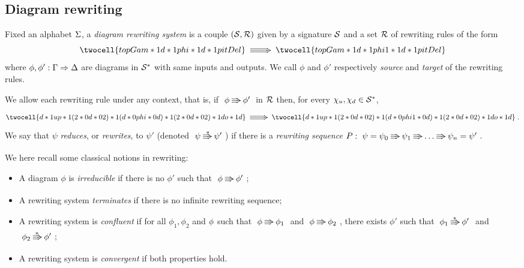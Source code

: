 \documentclass[a4paper]{article}
\begin{document}
\subsection{Diagram rewriting}
\begin{definition}
Fixed an alphabet $\Sigma$, a \emph{diagram rewriting system} is  a couple $(\mathcal S, \mathcal R)$ given by a signature $\mathcal S$ and a set $\mathcal R$ of rewriting rules of the form
$$
\twocell{topGam *1 d *1 phi *1 d *1 pitDel}
\xymatrix{\ar@3[r]&}
\twocell{topGam *1 d *1 phi1 *1 d *1 pitDel}
$$
where $\phi, \phi': \Gamma \Rightarrow \Delta$ are diagrams in $\mathcal S^*$ with same inputs and outputs. We call $\phi$ and $\phi'$ respectively \emph{source} and \emph{target} of the rewriting rules.
\end{definition}

\begin{definition}
We allow each rewriting  rule under any context, that is, if  $\xymatrix@C=1em{ \phi \ar@3[r] & \phi'}$ in $\mathcal R$ then, for every $\chi_u , \chi_d\in \mathcal S^*$,
$$
\twocell{d *1 up *1 (2 *0 d *0 2) *1 (d *0 phi *0 d ) *1 ( 2 *0 d *0 2) *1 do *1 d}
\xymatrix{\ar@3[r]&}
\twocell{d *1 up *1 (2 *0 d *0 2) *1 (d *0 phi1 *0 d ) *1 ( 2 *0 d *0 2) *1 do *1 d} \; .$$
 We say that $\psi$ \emph{reduces}, or \emph{rewrites}, to $\psi'$  (denoted $\xymatrix@C=1em{\psi \ar@3[r]^{*} & \psi'}$) if there is a \emph{rewriting sequence} $P: \xymatrix@C=1em{\psi=\psi_0 \ar@3[r] & \psi_1 \ar@3[r] & \dots  \ar@3[r] & \psi_n=\psi'}$.
\end{definition}

We here recall some classical notions in rewriting:

\begin{itemize}
\item A diagram $\phi$ is \emph{irreducible} if there is no $\phi'$ such that $\xymatrix@C=1em{\phi \ar@3[r] & \phi'}$;

\item A rewriting system \emph{terminates} if there is  no infinite rewriting sequence;

\item A rewriting system is \emph{confluent} if for all $\phi_1,\phi_2$ and $\phi$ such that $\xymatrix@C=1em{\phi \ar@3[r] & \phi_1}$ and $\xymatrix@C=1em{\phi \ar@3[r] & \phi_2 }$, there exists $\phi' $ such that $\xymatrix@C=1em{\phi_1 \ar@3[r]^{*} & \phi'} $  and $\xymatrix@C=1em{\phi_2 \ar@3[r]^{*} & \phi'}$;

\item A rewriting system is \emph{convergent} if both properties hold.

\end{itemize}
\end{document}
